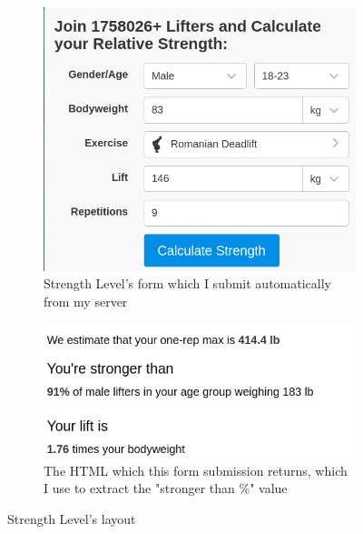 \documentclass{l4proj}
\begin{document}
\begin{figure}[H]
    \begin{subfigure}[t]{0.45\textwidth}
        \includegraphics[width=1.0\linewidth]{strength_level_layout.png}
        \caption{Strength Level's form which I submit automatically from my server} 
    \end{subfigure}
    \begin{subfigure}[t]{0.45\textwidth}
      \includegraphics[width=1.0\linewidth]{strength_level_stronger_than.png}    
      \caption{The HTML which this form submission returns, which I use to extract the "stronger than \%" value}
    \end{subfigure}
    \caption{Strength Level's layout}
    \label{fig:strength_level}
\end{figure}
\end{document}
